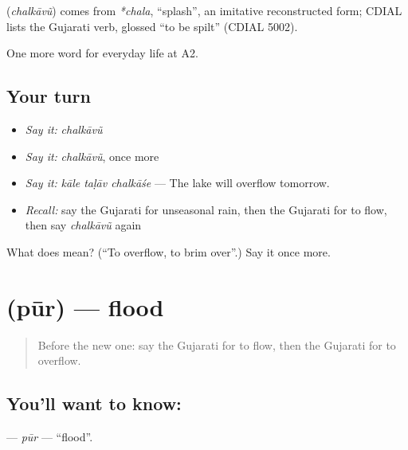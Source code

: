 \begin{cousinweb}
\textbf{} (\emph{chalkāvũ}) comes from \emph{*chala}, \textquotedblleft{}splash\textquotedblright{}, an imitative reconstructed form; CDIAL lists the Gujarati verb, glossed \textquotedblleft{}to be spilt\textquotedblright{} (CDIAL 5002).
\end{cousinweb}

\begin{grammarlens}[title={What you've built}]
One more word for everyday life at A2.
\end{grammarlens}

\subsection*{Your turn}
\begin{itemize}
\raggedright
  \item \emph{Say it:} \emph{chalkāvũ}
  \item \emph{Say it:} \emph{chalkāvũ}, once more
  \item \emph{Say it:} \emph{kāle taḷāv chalkāśe} — The lake will overflow tomorrow.
  \item \emph{Recall:} say the Gujarati for unseasonal rain, then the Gujarati for to flow, then say \emph{chalkāvũ} again
\end{itemize}

\begin{tcolorbox}[breakable,colback=teal!4,colframe=teal!35!black,title={Before you move on}]
What does  mean? (\textquotedblleft{}To overflow, to brim over\textquotedblright{}.) Say it once more.
\end{tcolorbox}
\section[\texorpdfstring{\gu{પૂર} (pūr)}{પૂર (pūr)}]{ (pūr) — flood}

\label{lesson:GU-C220-pur}



\begin{quote}
Before the new one: say the Gujarati for to flow, then the Gujarati for to overflow.
\end{quote}

\subsection*{You'll want to know: }
\textbf{} — \emph{pūr} — \textquotedblleft{}flood\textquotedblright{}.

